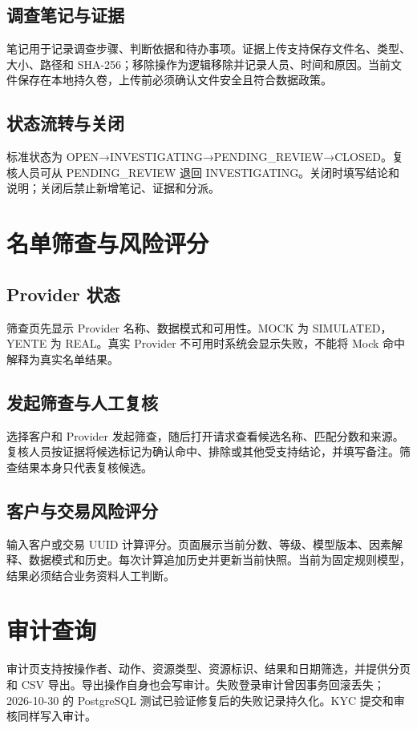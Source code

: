 \documentclass[UTF8,openany,zihao=-4]{ctexrep}
\begin{document}
\section{调查笔记与证据}
笔记用于记录调查步骤、判断依据和待办事项。证据上传支持保存文件名、类型、大小、路径和 SHA-256；移除操作为逻辑移除并记录人员、时间和原因。当前文件保存在本地持久卷，上传前必须确认文件安全且符合数据政策。

\section{状态流转与关闭}
标准状态为 OPEN→INVESTIGATING→PENDING\_REVIEW→CLOSED。复核人员可从 PENDING\_REVIEW 退回 INVESTIGATING。关闭时填写结论和说明；关闭后禁止新增笔记、证据和分派。

\chapter{名单筛查与风险评分}
\section{Provider 状态}
筛查页先显示 Provider 名称、数据模式和可用性。MOCK 为 SIMULATED，YENTE 为 REAL。真实 Provider 不可用时系统会显示失败，不能将 Mock 命中解释为真实名单结果。

\section{发起筛查与人工复核}
选择客户和 Provider 发起筛查，随后打开请求查看候选名称、匹配分数和来源。复核人员按证据将候选标记为确认命中、排除或其他受支持结论，并填写备注。筛查结果本身只代表复核候选。

\section{客户与交易风险评分}
输入客户或交易 UUID 计算评分。页面展示当前分数、等级、模型版本、因素解释、数据模式和历史。每次计算追加历史并更新当前快照。当前为固定规则模型，结果必须结合业务资料人工判断。

\chapter{审计查询}
审计页支持按操作者、动作、资源类型、资源标识、结果和日期筛选，并提供分页和 CSV 导出。导出操作自身也会写审计。失败登录审计曾因事务回滚丢失；2026-10-30 的 PostgreSQL 测试已验证修复后的失败记录持久化。KYC 提交和审核同样写入审计。
\end{document}

